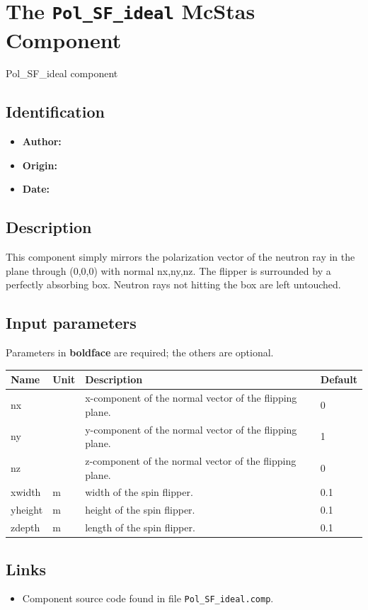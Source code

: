 \section{The \texttt{Pol\_SF\_ideal} McStas Component}
Pol\_SF\_ideal component

\subsection*{Identification}
\begin{itemize}
  \item \textbf{Author:} 
  \item \textbf{Origin:} 
  \item \textbf{Date:} 
\end{itemize}

\subsection*{Description}
This component simply mirrors the polarization vector of the neutron ray in the plane through (0,0,0) with normal nx,ny,nz. The flipper is surrounded by a perfectly absorbing box. Neutron rays not hitting the box are left untouched.

\subsection*{Input parameters}
Parameters in \textbf{boldface} are required; the others are optional.

\begin{longtable}{p{}p{}p{}p{}}
\toprule
\textbf{Name} & \textbf{Unit} & \textbf{Description} & \textbf{Default} \\
\midrule
\endhead
nx &   & x-component of the normal vector of the flipping plane. & 0 \\
ny &   & y-component of the normal vector of the flipping plane. & 1 \\
nz &   & z-component of the normal vector of the flipping plane. & 0 \\
xwidth & m & width of the spin flipper. & 0.1 \\
yheight & m & height of the spin flipper. & 0.1 \\
zdepth & m & length of the spin flipper. & 0.1 \\
\bottomrule
\end{longtable}

\subsection*{Links}
\begin{itemize}
  \item Component source code found in file \texttt{Pol\_SF\_ideal.comp}.
\end{itemize}
